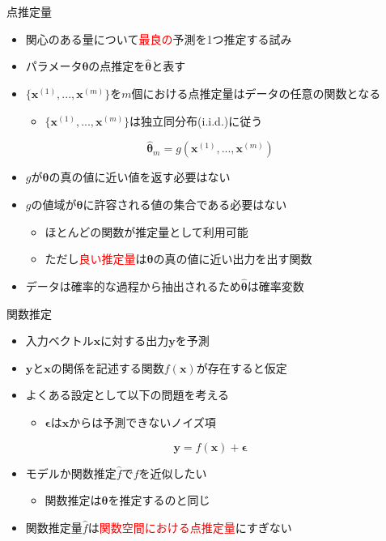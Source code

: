 \documentclass[dvipdfmx, 10pt]{beamer}
\begin{document}
\begin{frame}{点推定量}
  \begin{itemize}
    \item 関心のある量について\textcolor{red}{最良の}予測を1つ推定する試み
    \item パラメータ$\bm{\theta}$の点推定を$\hat{\bm{\theta}}$と表す
    \item $\{\bm{x}^{(1)} , ..., \bm{x}^{(m)}\}$を$m$個における点推定量はデータの任意の関数となる
    \begin{itemize}
      \item $\{\bm{x}^{(1)} , ..., \bm{x}^{(m)}\}$は独立同分布(i.i.d.)に従う
    \end{itemize}
  \end{itemize}
  \begin{equation}
    \hat{\bm{\theta}}_{m} = g(\bm{x}^{(1)} , ..., \bm{x}^{(m)})
  \end{equation}
  \begin{itemize}
    \item $g$が$\bm{\theta}$の真の値に近い値を返す必要はない
    \item $g$の値域が$\bm{\theta}$に許容される値の集合である必要はない
    \begin{itemize}
      \item ほとんどの関数が推定量として利用可能
      \item ただし\textcolor{red}{良い推定量}は$\bm{\theta}$の真の値に近い出力を出す関数
    \end{itemize}
    \item データは確率的な過程から抽出されるため$\hat{\bm{\theta}}$は確率変数
  \end{itemize}
\end{frame}


\begin{frame}{関数推定}
  \begin{itemize}
    \item 入力ベクトル$\bm{x}$に対する出力$\bm{y}$を予測
    \item $\bm{y}$と$\bm{x}$の関係を記述する関数$f(\bm{x})$が存在すると仮定
    \item よくある設定として以下の問題を考える
    \begin{itemize}
      \item $\bm{\epsilon}$は$\bm{x}$からは予測できないノイズ項
    \end{itemize}
  \end{itemize}
  \begin{equation}
    \bm{y} = f(\bm{x}) + \bm{\epsilon}
  \end{equation}
  \begin{itemize}
    \item モデルか関数推定$\hat{f}$で$f$を近似したい
    \begin{itemize}
      \item 関数推定は$\bm{\theta}$を推定するのと同じ
    \end{itemize}
  \item 関数推定量$\hat{f}$は\textcolor{red}{関数空間における点推定量}にすぎない
  \end{itemize}
\end{frame}
\end{document}
